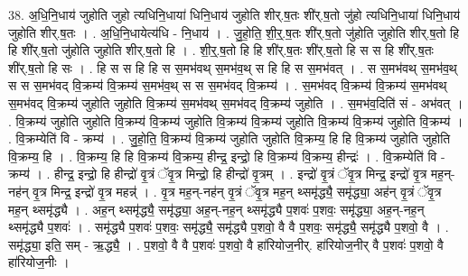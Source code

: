 \documentclass[17pt]{extarticle}
\begin{document}
38. अ॒धि॒नि॒धाय॑ जुहोति जुहो त्यधिनि॒धाया॑ धिनि॒धाय॑ जुहोति शीर्.ष॒तः शी॑र्.ष॒तो जु॑हो त्यधिनि॒धाया॑ धिनि॒धाय॑ जुहोति शीर्.ष॒तः । . अ॒धि॒नि॒धायेत्य॑धि - नि॒धाय॑ । . जु॒हो॒ति॒ शी॒र्॒.ष॒तः शी॑र्.ष॒तो जु॑होति जुहोति शीर्.ष॒तो हि हि शी॑र्.ष॒तो जु॑होति जुहोति शीर्.ष॒तो हि । . शी॒र्॒.ष॒तो हि हि शी॑र्.ष॒तः शी॑र्.ष॒तो हि स स हि शी॑र्.ष॒तः शी॑र्.ष॒तो हि सः । . हि स स हि हि स स॒मभ॑वथ् स॒मभ॑व॒थ् स हि हि स स॒मभ॑वत् । . स स॒मभ॑वथ् स॒मभ॑व॒थ् स स स॒मभ॑वद् वि॒क्रम्य॑ वि॒क्रम्य॑ स॒मभ॑व॒थ् स स स॒मभ॑वद् वि॒क्रम्य॑ । . स॒मभ॑वद् वि॒क्रम्य॑ वि॒क्रम्य॑ स॒मभ॑वथ् स॒मभ॑वद् वि॒क्रम्य॑ जुहोति जुहोति वि॒क्रम्य॑ स॒मभ॑वथ् स॒मभ॑वद् वि॒क्रम्य॑ जुहोति । . स॒मभ॑व॒दिति॑ सं - अभ॑वत् । . वि॒क्रम्य॑ जुहोति जुहोति वि॒क्रम्य॑ वि॒क्रम्य॑ जुहोति वि॒क्रम्य॑ वि॒क्रम्य॑ जुहोति वि॒क्रम्य॑ वि॒क्रम्य॑ जुहोति वि॒क्रम्य॑ । . वि॒क्रम्येति॑ वि - क्रम्य॑ । . जु॒हो॒ति॒ वि॒क्रम्य॑ वि॒क्रम्य॑ जुहोति जुहोति वि॒क्रम्य॒ हि हि वि॒क्रम्य॑ जुहोति जुहोति वि॒क्रम्य॒ हि । . वि॒क्रम्य॒ हि हि वि॒क्रम्य॑ वि॒क्रम्य॒ हीन्द्र॒ इन्द्रो॒ हि वि॒क्रम्य॑ वि॒क्रम्य॒ हीन्द्रः॑ । . वि॒क्रम्येति॑ वि - क्रम्य॑ । . हीन्द्र॒ इन्द्रो॒ हि हीन्द्रो॑ वृ॒त्रं ॅवृ॒त्र मिन्द्रो॒ हि हीन्द्रो॑ वृ॒त्रम् । . इन्द्रो॑ वृ॒त्रं ॅवृ॒त्र मिन्द्र॒ इन्द्रो॑ वृ॒त्र मह॒न्-नह॑न् वृ॒त्र मिन्द्र॒ इन्द्रो॑ वृ॒त्र महन्न्॑ । . वृ॒त्र मह॒न्-नह॑न् वृ॒त्रं ॅवृ॒त्र मह॒न् थ्समृ॑द्ध्यै॒ समृ॑द्ध्या॒ अह॑न् वृ॒त्रं ॅवृ॒त्र मह॒न् थ्समृ॑द्ध्यै । . अह॒न् थ्समृ॑द्ध्यै॒ समृ॑द्ध्या॒ अह॒न्-नह॒न् थ्समृ॑द्ध्यै प॒शवः॑ प॒शवः॒ समृ॑द्ध्या॒ अह॒न्-नह॒न् थ्समृ॑द्ध्यै प॒शवः॑ । . समृ॑द्ध्यै प॒शवः॑ प॒शवः॒ समृ॑द्ध्यै॒ समृ॑द्ध्यै प॒शवो॒ वै वै प॒शवः॒ समृ॑द्ध्यै॒ समृ॑द्ध्यै प॒शवो॒ वै । . समृ॑द्ध्या॒ इति॒ सम् - ऋ॒द्ध्यै॒ । . प॒शवो॒ वै वै प॒शवः॑ प॒शवो॒ वै हा॑रियोज॒नीर्. हा॑रियोज॒नीर् वै प॒शवः॑ प॒शवो॒ वै हा॑रियोज॒नीः । \newline
\end{document}
